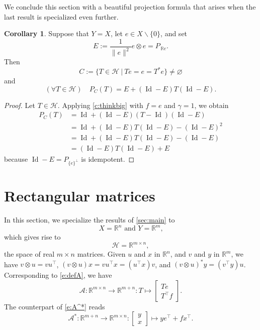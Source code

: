 \documentclass[12pt]{article}
\newcommand{\menge}[2]{\big\{{#1}~\big |~{#2}\big\}}
\newcommand{\RR}{\ensuremath{\mathbb R}}
\newcommand{\Id}{\ensuremath{\operatorname{Id}}}
\theoremstyle{definition}
\newtheorem{corollary}[theorem]{Corollary}
\providecommand{\RR}{\mathbb{R}}
\providecommand{\Id}{\operatorname{{ Id}}}
\providecommand{\Id}{\operatorname{Id}}
\providecommand{\RR}{\mathbb{R}}
\providecommand{\mA}{\mathcal{A}}
\providecommand{\mH}{\mathcal{H}}
\begin{document}
{We conclude this section with a beautiful
projection formula that arises when
the last result is specialized even further. 

\begin{corollary}
\label{c:abstractTakouda}
Suppose that $Y=X$, let $e\in X\smallsetminus\{0\}$, 
and set 
\begin{equation}
E:= \frac{1}{\|e\|^{2}}e\otimes e = P_{\,\RR e}.
\end{equation}
Then 
\begin{equation}
C := \menge{T\in\mH}{Te=e=T^* e}
\neq\varnothing
\end{equation}
and 
\begin{equation}
(\forall T\in\mH)\quad P_C(T) = E+(\Id-E)T(\Id-E). 
\end{equation}
\end{corollary}
\begin{proof}
Let $T\in\mathcal{H}$. 
Applying \cref{c:thinkbig} 
with $f=e$ and $\gamma=1$, we obtain 
\begin{subequations}
\begin{align}
P_C(T) 
&= \Id + (\Id-E)(T-\Id)(\Id-E)\\
&= \Id+(\Id-E)T(\Id-E)-(\Id-E)^2\\
&= \Id+(\Id-E)T(\Id-E)-(\Id-E)\\
&= (\Id-E)T(\Id-E)+E
\end{align}
\end{subequations}
because $\Id-E=P_{\{e\}^\perp}$ is idempotent. 
\end{proof}


\section{Rectangular matrices}
\label{sec:matrices}

In this section, we specialize the results of 
\cref{sec:main} to 
\begin{equation}
\text{$X=\RR^n$ and $Y=\RR^m$,}
\end{equation}
which gives rise to 
\begin{equation}
\mH = \RR^{m\times n},
\end{equation}
the space of real $m\times n$ matrices. 
Given $u$ and $x$ in $\RR^n$, and $v$ and $y$ in $\RR^m$, we have 
$v\otimes u = vu^\intercal$, 
$(v\otimes u)x=vu^\intercal x = (u^\intercal x)v$, 
and $(v\otimes u)^*y = (v^\intercal y) u$. 
Corresponding to \cref{e:defA}, we have 
\begin{equation}
\mA\colon \RR^{m\times n}\to \RR^{m+n}\colon T\mapsto
\begin{bmatrix}
Te\\
T^\intercal f
\end{bmatrix}.
\end{equation}
The counterpart of \cref{e:A^*} reads
\begin{equation}
\mathcal{A}^*\colon \RR^{m+n}\to\RR^{m\times n}
\colon 
\begin{bmatrix}
y\\
x
\end{bmatrix}
\mapsto 
ye^\intercal + fx^\intercal.
\end{equation}

}
\end{document}
